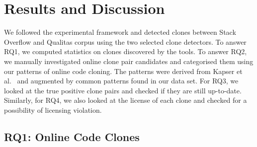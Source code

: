 \documentclass[sigconf,review, anonymous]{acmart}
\begin{document}

\section{Results and Discussion}

We followed the experimental framework and detected clones between Stack Overflow and Qualitas corpus using the two selected clone detectors. To answer RQ1, we computed statistics on clones discovered by the tools. To answer RQ2, we manually investigated online clone pair candidates and categorised them using our patterns of online code cloning. The patterns were derived from Kapser et al.~\cite{Kapser2003} and augmented by common patterns found in our data set. For RQ3, we looked at the true positive clone pairs and checked if they are still up-to-date. Similarly, for RQ4, we also looked at the license of each clone and checked for a possibility of licensing violation.

\subsection{RQ1: Online Code Clones} 
\end{document}

